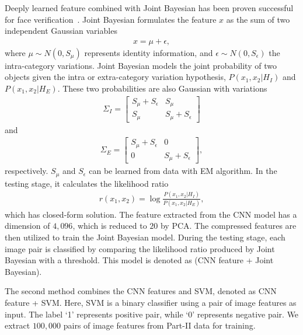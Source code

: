 \documentclass[10pt,twocolumn,letterpaper]{article}
\begin{document}
Deeply learned feature combined with Joint Bayesian has been proven successful for face verification~\cite{Sun14}. Joint Bayesian formulates the feature $x$ as the sum of two independent Gaussian variables
\begin{align}
  x=\mu + \epsilon,
\end{align}
where $\mu \sim N(0,S_{\mu})$ represents identity information, and $\epsilon \sim N(0,S_{\epsilon})$ the intra-category variations. Joint Bayesian models the joint probability of two objects given the intra or extra-category variation hypothesis, $P(x_1,x_2| H_I)$ and $P(x_1, x_2 | H_E)$. These two probabilities are also Gaussian with variations
\begin{align}
  \Sigma_I = \left[ \begin{array}{cc}
  S_{\mu}+S_{\epsilon} & S_{\mu}\\
  S_{\mu} & S_{\mu} + S_{\epsilon} \end{array} \right]
\end{align}
and
\begin{align}
  \Sigma_E = \left[ \begin{array}{cc}
  S_{\mu}+S_{\epsilon} &0\\
  0 & S_{\mu} + S_{\epsilon}
  \end{array} \right],
\end{align}
respectively. $S_{\mu}$ and $S_{\epsilon}$ can be learned from data with EM algorithm. In the testing stage, it calculates the likelihood ratio
\begin{align}
  r(x_1, x_2) = \log \frac{P(x_1, x_2 | H_I)}{P(x_1, x_2 | H_E)},
\end{align}
which has closed-form solution.
%
The feature extracted from the CNN model has a dimension of $4,096$, which is reduced to $20$ by PCA. The compressed features are then utilized to train the Joint Bayesian model.
%
During the testing stage, each image pair is classified by comparing the likelihood ratio produced by Joint Bayesian with a threshold. This model is denoted as (CNN feature + Joint Bayesian).

The second method combines the CNN features and SVM, denoted as CNN feature + SVM. Here, SVM is a binary classifier using a pair of image features as input. The label `1' represents positive pair, while `0' represents negative pair.
%
We extract $100,000$ pairs of image features from Part-II data for training.
\end{document}

